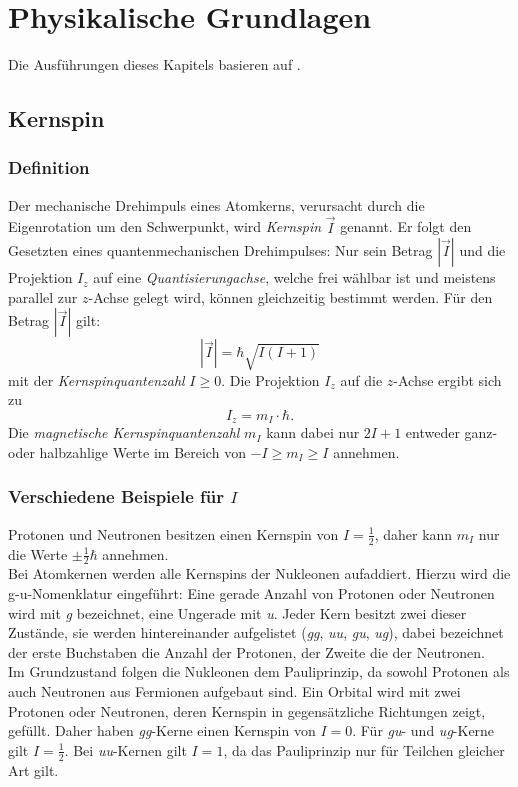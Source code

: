 \section{Physikalische Grundlagen}
Die Ausführungen dieses Kapitels basieren auf \cite{manual}.
\subsection{Kernspin}
\subsubsection{Definition}
Der mechanische Drehimpuls eines Atomkerns, verursacht durch die Eigenrotation um den Schwerpunkt, wird \emph{Kernspin} $\vec{I}$
genannt. Er folgt den Gesetzten eines quantenmechanischen Drehimpulses: Nur sein Betrag $|\vec{I}|$ und die Projektion $I_z$ auf 
eine \emph{Quantisierungachse}, welche frei wählbar ist und meistens parallel zur $z$-Achse gelegt wird, können gleichzeitig 
bestimmt werden. Für den Betrag $|\vec{I}|$ gilt:
\begin{equation}
  \label{eq:spin:abs}
  |\vec{I}| = \hbar \sqrt{I (I + 1)}
\end{equation}
mit der \emph{Kernspinquantenzahl} $I \geq 0$. Die Projektion $I_z$ auf die $z$-Achse ergibt sich zu
\begin{equation}
  \label{eq:spin:z}
  I_z = m_I \cdot \hbar .
\end{equation}
Die \emph{magnetische Kernspinquantenzahl} $m_I$ kann dabei nur $2 I + 1$ entweder ganz- oder halbzahlige Werte im Bereich von 
$-I \geq m_I \geq I$ annehmen.
\subsubsection{Verschiedene Beispiele für $I$}
Protonen und Neutronen besitzen einen Kernspin von $I=\frac{1}{2}$, daher kann $m_I$ nur die Werte $\pm\frac{1}{2}\hbar$ annehmen. \\
Bei Atomkernen werden alle Kernspins der Nukleonen aufaddiert. Hierzu wird die g-u-Nomenklatur eingeführt: Eine gerade Anzahl von 
Protonen oder Neutronen wird mit \emph{g} bezeichnet, eine Ungerade mit \emph{u}. Jeder Kern besitzt zwei dieser Zustände, sie werden hintereinander 
aufgelistet (\emph{gg}, \emph{uu}, \emph{gu}, \emph{ug}), dabei bezeichnet der erste Buchstaben die Anzahl der Protonen, der Zweite die der 
Neutronen.\\
Im Grundzustand folgen die Nukleonen dem Pauliprinzip, da sowohl Protonen als auch Neutronen aus Fermionen aufgebaut sind. 
Ein Orbital wird mit zwei Protonen oder Neutronen, deren Kernspin in gegensätzliche  
Richtungen zeigt, gefüllt. Daher haben \emph{gg}-Kerne einen Kernspin von $I = 0$. Für \emph{gu}- und \emph{ug}-Kerne gilt $I = \frac{1}{2}$. 
Bei \emph{uu}-Kernen gilt $I=1$, da das Pauliprinzip nur für Teilchen gleicher Art gilt.

